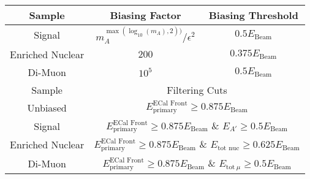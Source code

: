 \begin{tabular}{|c|c|c|}
    \hline
    Sample & Biasing Factor & Biasing Threshold
    \\ \hline
    Signal & $m_A^{\max(\log_{10}(m_A),2))}/\epsilon^2$ & $0.5E_\text{Beam}$
    \\
    Enriched Nuclear & $200$ & $0.375E_\text{Beam}$
    \\
    Di-Muon & $10^5$ & $0.5E_\text{Beam}$
    \\
    \hline \hline
    Sample & \multicolumn{2}{c|}{Filtering Cuts}
    \\ \hline
    Unbiased  
        & \multicolumn{2}{c|}{$E_{\text{primary}}^{\text{ECal Front}} \geq 0.875E_\text{Beam}$}
    \\
    Signal 
        & \multicolumn{2}{c|}{$E_{\text{primary}}^{\text{ECal Front}} \geq 0.875E_\text{Beam}$ \& $E_{A'}\geq 0.5E_\text{Beam}$}
    \\
    Enriched Nuclear
        & \multicolumn{2}{c|}{$E_{\text{primary}}^{\text{ECal Front}} \geq 0.875E_\text{Beam}$ \& $E_{\text{tot nuc}}\geq 0.625E_\text{Beam}$}
    \\
    Di-Muon
        & \multicolumn{2}{c|}{$E_{\text{primary}}^{\text{ECal Front}} \geq 0.875E_\text{Beam}$ \& $E_{\text{tot}~\mu}\geq 0.5E_\text{Beam}$}
    \\ \hline
\end{tabular}
